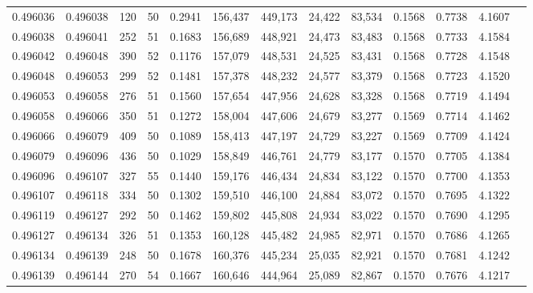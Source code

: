 \begin{tabular}{rrrrrrrrrrrrr}
0.496036 & 0.496038 & 120 &  50 &                                     0.2941 & 156,437 & 449,173 &  24,422 &  83,534 & 0.1568 & 0.7738 & 4.1607 \\
0.496038 & 0.496041 & 252 &  51 &                                     0.1683 & 156,689 & 448,921 &  24,473 &  83,483 & 0.1568 & 0.7733 & 4.1584 \\
0.496042 & 0.496048 & 390 &  52 &                                     0.1176 & 157,079 & 448,531 &  24,525 &  83,431 & 0.1568 & 0.7728 & 4.1548 \\
0.496048 & 0.496053 & 299 &  52 &                                     0.1481 & 157,378 & 448,232 &  24,577 &  83,379 & 0.1568 & 0.7723 & 4.1520 \\
0.496053 & 0.496058 & 276 &  51 &                                     0.1560 & 157,654 & 447,956 &  24,628 &  83,328 & 0.1568 & 0.7719 & 4.1494 \\
0.496058 & 0.496066 & 350 &  51 &                                     0.1272 & 158,004 & 447,606 &  24,679 &  83,277 & 0.1569 & 0.7714 & 4.1462 \\
0.496066 & 0.496079 & 409 &  50 &                                     0.1089 & 158,413 & 447,197 &  24,729 &  83,227 & 0.1569 & 0.7709 & 4.1424 \\
0.496079 & 0.496096 & 436 &  50 &                                     0.1029 & 158,849 & 446,761 &  24,779 &  83,177 & 0.1570 & 0.7705 & 4.1384 \\
0.496096 & 0.496107 & 327 &  55 &                                     0.1440 & 159,176 & 446,434 &  24,834 &  83,122 & 0.1570 & 0.7700 & 4.1353 \\
0.496107 & 0.496118 & 334 &  50 &                                     0.1302 & 159,510 & 446,100 &  24,884 &  83,072 & 0.1570 & 0.7695 & 4.1322 \\
0.496119 & 0.496127 & 292 &  50 &                                     0.1462 & 159,802 & 445,808 &  24,934 &  83,022 & 0.1570 & 0.7690 & 4.1295 \\
0.496127 & 0.496134 & 326 &  51 &                                     0.1353 & 160,128 & 445,482 &  24,985 &  82,971 & 0.1570 & 0.7686 & 4.1265 \\
0.496134 & 0.496139 & 248 &  50 &                                     0.1678 & 160,376 & 445,234 &  25,035 &  82,921 & 0.1570 & 0.7681 & 4.1242 \\
0.496139 & 0.496144 & 270 &  54 &                                     0.1667 & 160,646 & 444,964 &  25,089 &  82,867 & 0.1570 & 0.7676 & 4.1217 \\

\end{tabular}
